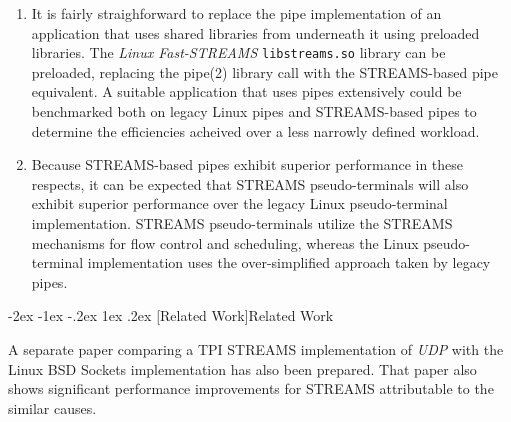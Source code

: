 \documentclass[letterpaper,final,notitlepage,twocolumn,10pt,twoside]{article}
\makeatletter
\renewcommand\section{\@startsection {section}{1}{\z@}%
                                   {-2ex \@plus -1ex \@minus -.2ex}%
                                   {1ex \@plus .2ex}%
                                   {\normalfont\large\bfseries}}
\makeatother
\begin{document}
\begin{enumerate}

\item

It is fairly straighforward to replace the pipe implementation of an
application that uses shared libraries from underneath it using preloaded
libraries.  The \textsl{Linux Fast-STREAMS} \texttt{libstreams.so} library can
be preloaded, replacing the pipe(2) library call with the STREAMS-based pipe
equivalent.  A suitable application that uses pipes extensively could be
benchmarked both on legacy Linux pipes and STREAMS-based pipes to determine
the efficiencies acheived over a less narrowly defined workload.

\item

Because STREAMS-based pipes exhibit superior performance in these respects, it
can be expected that STREAMS pseudo-terminals will also exhibit superior
performance over the legacy Linux pseudo-terminal implementation.  STREAMS
pseudo-terminals utilize the STREAMS mechanisms for flow control and
scheduling, whereas the Linux pseudo-terminal implementation uses the
over-simplified approach taken by legacy pipes.

\end{enumerate}

\section[Related Work]{Related Work}

A separate paper comparing a TPI STREAMS implementation of \textsl{UDP} with
the Linux BSD Sockets implementation has also been prepared.  That paper also
shows significant performance improvements for STREAMS attributable to the
similar causes.

\FloatBarrier
{}

\end{document}
